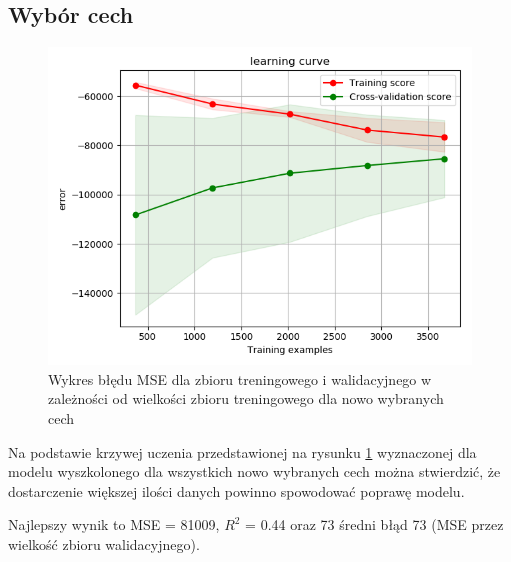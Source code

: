 \documentclass[a4paper,12pt]{article}
\begin{document}
	\subsection{Wybór cech}
	\begin{figure}[h]
		\centering
		\includegraphics[scale=0.6]{obrazy/learning_curve_new.png} 
		\caption{Wykres błędu MSE dla zbioru treningowego i walidacyjnego w zależności od wielkości zbioru treningowego dla nowo wybranych cech}
		\label{learning_curve_new}
	\end{figure}	
	Na podstawie krzywej uczenia przedstawionej na rysunku \ref{learning_curve_new} wyznaczonej dla modelu wyszkolonego dla wszystkich nowo wybranych cech można stwierdzić, że dostarczenie większej ilości danych powinno spowodować poprawę modelu.
	
	Najlepszy wynik to MSE = 81009, $R^2$ = 0.44 oraz 73 średni błąd 73 (MSE przez wielkość zbioru walidacyjnego).
	
\end{document}

